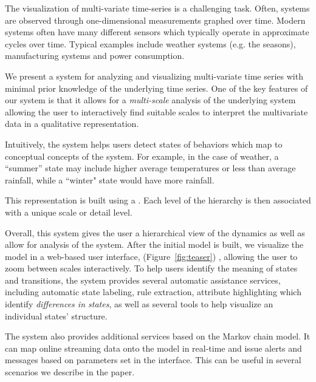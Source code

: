 The visualization of multi-variate time-series is a challenging task. Often, systems are observed through one-dimensional measurements graphed over time. Modern systems often have many different sensors which 
typically operate in approximate cycles over time. Typical examples include weather systems (e.g. the seasons), manufacturing systems and power consumption. 

We present a system for analyzing and visualizing multi-variate time series with minimal prior knowledge of the underlying time series. One of the key features of our system is that it allows for a \emph{multi-scale} analysis of the underlying system allowing the user to interactively find suitable scales to interpret the multivariate data in a qualitative representation.  

Intuitively, the system helps users detect states of behaviors which map to conceptual concepts of the system. For example, in the case of weather, a ``summer'' state may include higher average temperatures or less than average rainfall, while a ``winter" state would have more rainfall. 

This representation is built using a . Each level of the hierarchy is then associated with a unique
scale or detail level.

Overall, this system gives the user a hierarchical view of the dynamics as well as 
allow for analysis of the system. After the initial model is built, we visualize the model
in a web-based user interface, (Figure~\ref{fig:teaser}) , allowing the 
user to zoom between scales interactively. To help users identify the
meaning of states and transitions, the system provides several automatic assistance services,
including automatic state labeling, rule extraction, attribute highlighting which
identify \emph{differences in states}, as well as several tools to help visualize an individual states'
structure. 

The system also provides additional services based on the Markov chain model. It can map online streaming data onto 
the model in real-time and issue alerts and messages based on parameters set in the interface. This can be useful in several scenarios we describe in the paper.

